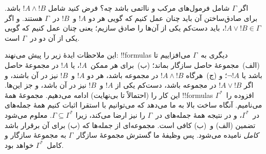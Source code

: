 \documentclass[../../../include/open-logic-section]{subfiles}
\begin{document}
اگر $\Gamma$ شامل فرمول‌های مرکب و نااتمی باشد چه؟ فرض کنید شامل
$!A \land !B$ باشد. برای صادق‌ساختن آن باید چنان عمل کنیم که گویی هر دو
$!A$ و~$!B$ در~$\Gamma$ هستند. و اگر $!A \lor !B \in \Gamma$، باید
دست‌کم یکی از آن‌ها را صادق سازیم؛ یعنی چنان عمل کنیم که گویی یکی از آن
دو در~$\Gamma$ است.

این ملاحظات ایدهٔ زیر را پیش می‌نهند: !!{formula}s دیگری به~$\Gamma$
می‌افزاییم تا (الف)~مجموعهٔ حاصل سازگار بماند؛ (ب)~برای هر
 ممکن~$!A$، یا $!A$ در مجموعهٔ
حاصل باشد یا $\lnot !A$؛ و (ج)~هرگاه $!A \land !B$ در مجموعه باشد، هر
دو $!A$ و~$!B$ نیز در آن باشند، و اگر $!A \lor !B$ در مجموعه باشد،
دست‌کم یکی از $!A$ و~$!B$ نیز در آن باشد، و جز این‌ها. این کار را
(احتمالاً تا بی‌نهایت) ادامه می‌دهیم. مجموعهٔ همهٔ !!{formula}s افزوده
را~$\Gamma^*$ می‌نامیم. آنگاه ساخت بالا
به ما می‌دهد که می‌توانیم با استقرا اثبات کنیم همهٔ جمله‌های
در~$\Gamma^*$، و در نتیجه همهٔ جمله‌های در~$\Gamma$ را نیز ارضا می‌کند،
زیرا $\Gamma \subseteq \Gamma^*$. معلوم می‌شود تضمین (الف) و~(ب) کافی
است. مجموعه‌ای از جمله‌ها که (ب) برای آن برقرار باشد \emph{کامل} نامیده
می‌شود. پس وظیفهٔ ما گسترش مجموعهٔ سازگار~$\Gamma$ به مجموعهٔ سازگار و
کامل~$\Gamma^*$ خواهد بود.
\end{document}
